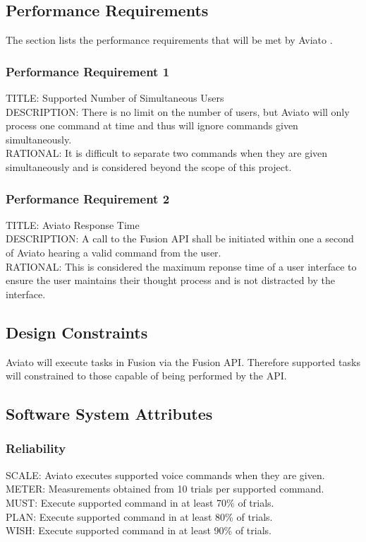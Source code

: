 \documentclass[onecolumn, draftclsnofoot,10pt, compsoc]{IEEEtran}
\def \botname{Aviato }
\begin{document}
    \subsection{Performance Requirements}
        The section lists the performance requirements that will be met by \botname.
        
        \subsubsection{Performance Requirement 1}
        TITLE: Supported Number of Simultaneous Users \\
        DESCRIPTION: There is no limit on the number of users, but \botname will only process one command at time and thus will ignore commands given simultaneously. \\
        RATIONAL: It is difficult to separate two commands when they are given simultaneously and is considered beyond the scope of this project.
        
        \subsubsection{Performance Requirement 2}
        TITLE: \botname Response Time \\
        DESCRIPTION: A call to the Fusion API shall be initiated within one a second of \botname hearing a valid command from the user. \\
        RATIONAL: This is considered the maximum reponse time of a user interface to ensure the user maintains their thought process and is not distracted by the interface.
        
    \subsection{Design Constraints}
        \botname will execute tasks in Fusion via the Fusion API. 
        Therefore supported tasks will constrained to those capable of being performed by the API.
        
    \subsection{Software System Attributes}
	   	\subsubsection{Reliability}
	   	SCALE: \botname executes supported voice commands when they are given. 
	   	METER: Measurements obtained from 10 trials per supported command.\\
	   	MUST: Execute supported command in at least 70\% of trials.\\
	   	PLAN: Execute supported command in at least 80\% of trials.\\
        WISH: Execute supported command in at least 90\% of trials.\\
   
\end{document}
